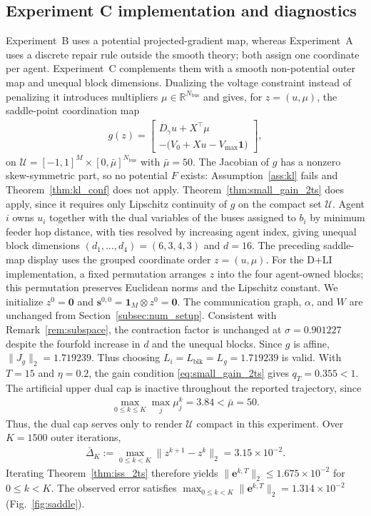 \documentclass[letterpaper, 10 pt, conference]{ieeeconf} %
\begin{document}
\subsection{Experiment C implementation and diagnostics}\label{app:experiment_c_details}
Experiment~B uses a potential projected-gradient map, whereas Experiment~A uses a discrete repair rule outside the smooth theory; both assign one coordinate per agent. Experiment~C complements them with a smooth non-potential outer map and unequal block dimensions. Dualizing the voltage constraint instead of penalizing it introduces multipliers \(\mu\in\mathbb R^{N_{\mathrm{bus}}}\) and gives, for \(z=(u,\mu)\), the saddle-point coordination map
\begin{align}
g(z)
=
\begin{bmatrix}
D_\gamma u+X^\top\mu\\[1mm]
-\bigl(V_0+Xu-V_{\max}\mathbf 1\bigr)
\end{bmatrix},
\end{align}
on \(\mathcal U=[-1,1]^M\times[0,\bar\mu]^{N_{\mathrm{bus}}}\) with \(\bar\mu=50\). The Jacobian of \(g\) has a nonzero skew-symmetric part, so no potential \(F\) exists: Assumption~\ref{ass:kl} fails and Theorem~\ref{thm:kl_conf} does not apply. Theorem~\ref{thm:small_gain_2ts} does apply, since it requires only Lipschitz continuity of \(g\) on the compact set \(\mathcal U\). Agent \(i\) owns \(u_i\) together with the dual variables of the buses assigned to \(b_i\) by minimum feeder hop distance, with ties resolved by increasing agent index, giving unequal block dimensions \((d_1,\dots,d_4)=(6,3,4,3)\) and \(d=16\). The preceding saddle-map display uses the grouped coordinate order \(z=(u,\mu)\). For the D+LI implementation, a fixed permutation arranges \(z\) into the four agent-owned blocks; this permutation preserves Euclidean norms and the Lipschitz constant. We initialize \(z^0=\mathbf0\) and \(\mathbf s^{0,0}=\mathbf1_M\otimes z^0=\mathbf0\). The communication graph, \(\alpha\), and \(W\) are unchanged from Section~\ref{subsec:num_setup}. Consistent with Remark~\ref{rem:subspace}, the contraction factor is unchanged at \(\sigma=0.901227\) despite the fourfold increase in \(d\) and the unequal blocks. Since \(g\) is affine, \(\|J_g\|_2=1.719239\). Thus choosing \(L_i=L_{\mathrm{blk}}=L_g=1.719239\) is valid. With \(T=15\) and \(\eta=0.2\), the gain condition \eqref{eq:small_gain_2ts} gives \(q_T=0.355<1\). The artificial upper dual cap is inactive throughout the reported trajectory, since 
\begin{align}
\max_{0\le k\le K}\max_j\mu_j^k
=
3.84
<
\bar\mu=50.
\end{align}
Thus, the dual cap serves only to render \(\mathcal U\) compact in this experiment.
Over \(K=1500\) outer iterations,
\begin{align}
\bar\Delta_K
:=
\max_{0\le k<K}\|z^{k+1}-z^k\|_2
=
3.15\times10^{-2}.
\end{align}
Iterating Theorem~\ref{thm:iss_2ts} therefore yields
\(\|\mathbf e^{k,T}\|_2\le1.675\times10^{-2}\) for
\(0\le k<K\).
The observed error satisfies \(\max_{0\le k<K}\|\mathbf e^{k,T}\|_2 = 1.314\times10^{-2}\) (Fig.~\ref{fig:saddle}). 
\end{document}
